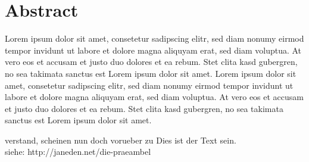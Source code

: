 \pagestyle{empty} %


\chapter*{Abstract} %
\label{cha:abtract}
	Lorem ipsum dolor sit amet, consetetur sadipscing elitr, sed diam nonumy eirmod tempor invidunt ut labore et dolore magna aliquyam erat, sed diam voluptua. At vero eos et accusam et justo duo dolores et ea rebum. Stet clita kasd gubergren, no sea takimata sanctus est Lorem ipsum dolor sit amet. Lorem ipsum dolor sit amet, consetetur sadipscing elitr, sed diam nonumy eirmod tempor invidunt ut labore et dolore magna aliquyam erat, sed diam voluptua. At vero eos et accusam et justo duo dolores et ea rebum. Stet clita kasd gubergren, no sea takimata sanctus est Lorem ipsum dolor sit amet.



verstand, scheinen nun doch vorueber zu Dies ist der Text sein. \\
siehe: http://janeden.net/die-praeambel
\nocite{Robinson2015}